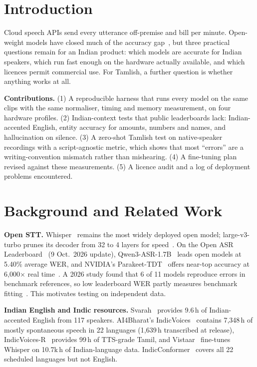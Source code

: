 \documentclass[conference]{IEEEtran}
\begin{document}
\section{Introduction}
Cloud speech APIs send every utterance off-premise and bill per minute. Open-weight models have closed much of the accuracy gap~\cite{srivastav2025openasr,pinggystt,pinggytts}, but three practical questions remain for an Indian product: which models are accurate for Indian speakers, which run fast enough on the hardware actually available, and which licences permit commercial use. For Tamlish, a further question is whether anything works at all.

\textbf{Contributions.} (1) A reproducible harness that runs every model on the same clips with the same normaliser, timing and memory measurement, on four hardware profiles. (2) Indian-context tests that public leaderboards lack: Indian-accented English, entity accuracy for amounts, numbers and names, and hallucination on silence. (3) A zero-shot Tamlish test on native-speaker recordings with a script-agnostic metric, which shows that most ``errors'' are a writing-convention mismatch rather than mishearing. (4) A fine-tuning plan revised against these measurements. (5) A licence audit and a log of deployment problems encountered.

\section{Background and Related Work}
\textbf{Open STT.} Whisper~\cite{radford2022whisper} remains the most widely deployed open model; large-v3-turbo prunes its decoder from 32 to 4 layers for speed~\cite{pinggystt}. On the Open ASR Leaderboard~\cite{openasrlb,srivastav2025openasr} (9 Oct.\ 2026 update), Qwen3-ASR-1.7B~\cite{qwen3asr2026} leads open models at 5.40\% average WER, and NVIDIA's Parakeet-TDT~\cite{xu2023tdt} offers near-top accuracy at 6,000$\times$ real time~\cite{pinggystt}. A 2026 study found that 6 of 11 models reproduce errors in benchmark references, so low leaderboard WER partly measures benchmark fitting~\cite{hfbenchopt}. This motivates testing on independent data.

\textbf{Indian English and Indic resources.} Svarah~\cite{javed2023svarah} provides 9.6\,h of Indian-accented English from 117 speakers. AI4Bharat's IndicVoices~\cite{javed2024indicvoices} contains 7,348\,h of mostly spontaneous speech in 22 languages (1,639\,h transcribed at release), IndicVoices-R~\cite{sankar2024indicvoicesr} provides 99\,h of TTS-grade Tamil, and Vistaar~\cite{bhogale2023vistaar} fine-tunes Whisper on 10.7k\,h of Indian-language data. IndicConformer~\cite{mc_indicconformer,gh_indicconformer} covers all 22 scheduled languages but not English.
\end{document}
